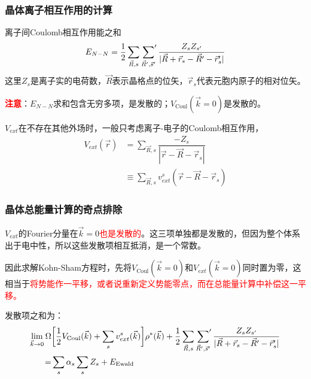 \documentclass[cjk,slidestop,compress,mathserif,blue]{beamer}
\begin{document}
\frame
{
	\frametitle{晶体离子相互作用的计算}
	离子间\textrm{Coulomb}相互作用能之和
	\begin{displaymath}
		E_{N-N}=\dfrac12\sum_{\vec R,s}\sideset{}{^{\prime}}\sum_{\vec R^{\prime},\vec s^{\prime}}\dfrac{Z_sZ_{s^{\prime}}}{|\vec R+\vec r_s-\vec R^{\prime}-\vec r_s^{\prime}|}
	\end{displaymath}
	这里$Z_s$是离子实的电荷数，$\vec R$表示晶格点的位矢，$\vec r_s$代表元胞内原子的相对位矢。

	\textcolor{red}{\textbf{注意}}：$E_{N-N}$求和包含无穷多项，是发散的；$V_{\mathrm{Coul}}(\vec k=0)$是发散的。
	
	$V_{ext}$在不存在其他外场时，一般只考虑离子-电子的\textrm{Coulomb}相互作用，
	\begin{displaymath}
		\begin{aligned}
			V_{ext}(\vec r)&=\sum_{\vec R,s}\dfrac{-Z_s}{|\vec r-\vec R-\vec r_s|}\\
			&\equiv\sum_{\vec R,s}v_{ext}^s(\vec r-\vec R-\vec r_s)
		\end{aligned}
	\end{displaymath}
}

\frame
{
	\frametitle{晶体总能量计算的奇点排除}
	$V_{ext}$的\textrm{Fourier}分量在$\vec k=0$\textcolor{red}{也是发散的}。这三项单独都是发散的，但因为整个体系出于电中性，所以这些发散项相互抵消，是一个常数。

	因此求解\textrm{Kohn-Sham}方程时，先将$V_{\mathrm{Coul}}(\vec k=0)$和$V_{ext}(\vec k=0)$同时置为零，这相当于\textcolor{red}{将势能作一平移，或者说重新定义势能零点，而在总能量计算中补偿这一平移。}

	发散项之和为：
	\begin{displaymath}
		\begin{aligned}
			\lim_{\vec k\rightarrow0}\Omega&\bigg[\dfrac12V_{\mathrm{Coul}}(\vec k)+\sum_sv_{ext}^s(\vec k)\bigg]\rho^{\ast}(\vec k)+\dfrac12\sum_{\vec R,s}\sideset{}{^{\prime}}\sum_{\vec R^{\prime},\vec s^{\prime}}\dfrac{Z_sZ_{s^{\prime}}}{|\vec R+\vec r_s-\vec R^{\prime}-\vec r_s^{\prime}|}\\
			=&\sum_s\alpha_s\sum_sZ_s+E_{\mathrm{Ewald}}
		\end{aligned}
	\end{displaymath}
}
\end{document}
